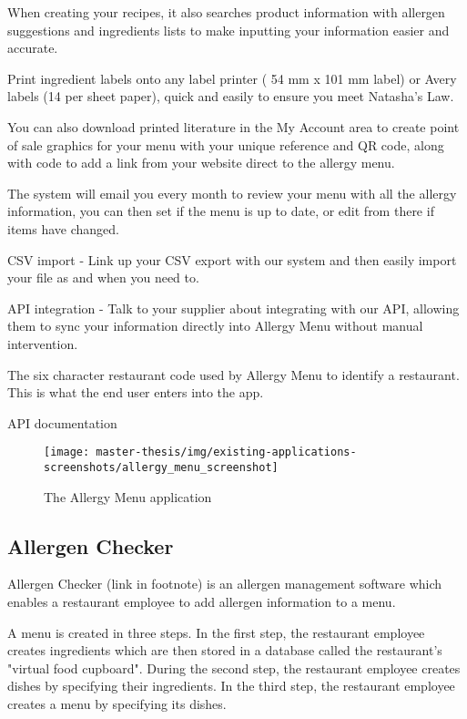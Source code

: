   When creating your recipes, it also searches product information with allergen suggestions and ingredients lists to make inputting your information easier and accurate.

  Print ingredient labels onto any label printer ( 54 mm x 101 mm label) or Avery labels (14 per sheet paper), quick and easily to ensure you meet Natasha's Law.

  You can also download printed literature in the My Account area to create point of sale graphics for your menu with your unique reference and QR code, along with code to add a link from your website direct to the allergy menu.

  The system will email you every month to review your menu with all the allergy information, you can then set if the menu is up to date, or edit from there if items have changed.

  CSV import - Link up your CSV export with our system and then easily import your file as and when you need to.

  API integration - Talk to your supplier about integrating with our API, allowing them to sync your information directly into Allergy Menu without manual intervention.

  The six character restaurant code used by Allergy Menu to identify a restaurant. This is what the end user enters into the app.

  API documentation

  \begin{figure}[h]
    \centering
    \texttt{[image: master-thesis/img/existing-applications-screenshots/allergy\_menu\_screenshot]}
    \caption{The Allergy Menu application}
  \end{figure}

\subsection*{Allergen Checker}
  Allergen Checker (link in footnote) is an allergen management software which enables a restaurant employee to add allergen information to a menu.
  
  A menu is created in three steps.
  In the first step, the restaurant employee creates ingredients which are then stored in a database called the restaurant's "virtual food cupboard".
  During the second step, the restaurant employee creates dishes by specifying their ingredients.
  In the third step, the restaurant employee creates a menu by specifying its dishes.
  
